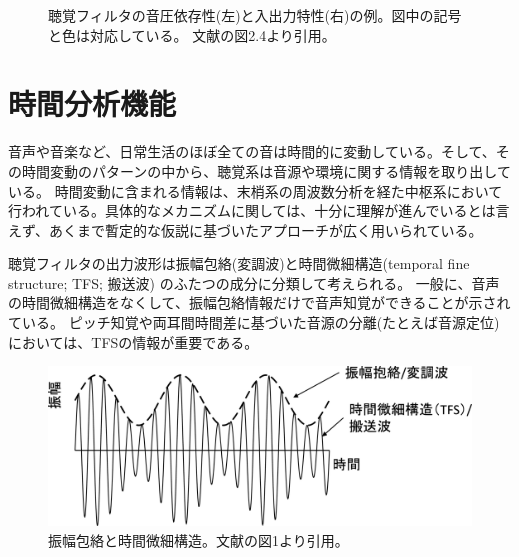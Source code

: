 \begin{figure}[h]
\begin{minipage}[t]{0.5\hsize}
        \label{fig:Basic_IOfunc}
    \end{minipage}
    \label{compression}
    \caption{聴覚フィルタの音圧依存性(左)と入出力特性(右)の例。図中の記号と色は対応している。
              文献\cite{yamamoto2023GESI}の図2.4より引用。}
\end{figure}

\newpage




\clearpage
\section{時間分析機能}
音声や音楽など、日常生活のほぼ全ての音は時間的に変動している。そして、その時間変動のパターンの中から、聴覚系は音源や環境に関する情報を取り出している。
時間変動に含まれる情報は、末梢系の周波数分析を経た中枢系において行われている。具体的なメカニズムに関しては、十分に理解が進んでいるとは言えず、あくまで暫定的な仮説に基づいたアプローチが広く用いられている。

聴覚フィルタの出力波形は振幅包絡(変調波)と時間微細構造(temporal fine structure; TFS; 搬送波) のふたつの成分に分類して考えられる。
一般に、音声の時間微細構造をなくして、振幅包絡情報だけで音声知覚ができることが示されている。
ピッチ知覚や両耳間時間差に基づいた音源の分離(たとえば音源定位)においては、TFSの情報が重要である。

\begin{figure}[h]
    \vspace{40pt}
    \hspace{20pt}
    \centering
    \includegraphics[width=0.8\hsize]{Figure/RelatedResearch/furukawa2016time.eps}
    \caption{振幅包絡と時間微細構造。文献\cite{furukawa2016time}の図1より引用。}
\end{figure}

